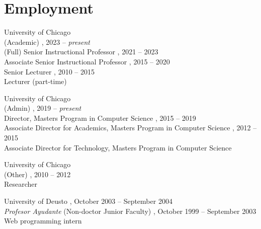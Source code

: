 \documentclass{resume}
\author{Borja Sotomayor}
\begin{document}
\maketitle	

\section*{\hspace{-1cm}Employment}
\begin{category}{University of Chicago\\(Academic)}
, 2023 -- \emph{present}\\
(Full) Senior Instructional Professor
, 2021 -- 2023\\
Associate Senior Instructional Professor
, 2015 -- 2020\\
Senior Lecturer
, 2010 -- 2015\\
Lecturer (part-time)
\end{category}
\begin{category}{University of Chicago\\(Admin)}
, 2019 -- \emph{present}\\
Director, Masters Program in Computer Science
, 2015 -- 2019\\
Associate Director for Academics, Masters Program in Computer Science
, 2012 -- 2015\\
Associate Director for Technology, Masters Program in Computer Science
\end{category}
\begin{category}{University of Chicago\\(Other)}
, 2010 -- 2012\\
Researcher
\end{category}
\begin{category}{University of Deusto}
, October 2003 -- September 2004\\
\emph{Profesor Ayudante} (Non-doctor Junior Faculty)
, October 1999 -- September 2003\\
Web programming intern
\end{category}

\end{document}
